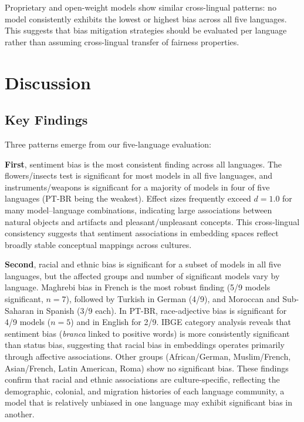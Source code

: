 \documentclass{sbc2019}
\begin{document}
Proprietary and open-weight models show similar cross-lingual patterns: no model consistently exhibits the lowest or highest bias across all five languages. This suggests that bias mitigation strategies should be evaluated per language rather than assuming cross-lingual transfer of fairness properties.

\section{Discussion}

\subsection{Key Findings}

Three patterns emerge from our five-language evaluation:

\textbf{First}, sentiment bias is the most consistent finding across all languages. The flowers/insects test is significant for most models in all five languages, and instruments/weapons is significant for a majority of models in four of five languages (PT-BR being the weakest). Effect sizes frequently exceed $d = 1.0$ for many model--language combinations, indicating large associations between natural objects and artifacts and pleasant/unpleasant concepts. This cross-lingual consistency suggests that sentiment associations in embedding spaces reflect broadly stable conceptual mappings across cultures.

\textbf{Second}, racial and ethnic bias is significant for a subset of models in all five languages, but the affected groups and number of significant models vary by language. Maghrebi bias in French is the most robust finding (5/9 models significant, $n = 7$), followed by Turkish in German (4/9), and Moroccan and Sub-Saharan in Spanish (3/9 each). In PT-BR, race-adjective bias is significant for 4/9 models ($n = 5$) and in English for 2/9. IBGE category analysis reveals that sentiment bias (\textit{branca} linked to positive words) is more consistently significant than status bias, suggesting that racial bias in embeddings operates primarily through affective associations. Other groups (African/German, Muslim/French, Asian/French, Latin American, Roma) show no significant bias. These findings confirm that racial and ethnic associations are culture-specific, reflecting the demographic, colonial, and migration histories of each language community, a model that is relatively unbiased in one language may exhibit significant bias in another.
\end{document}

